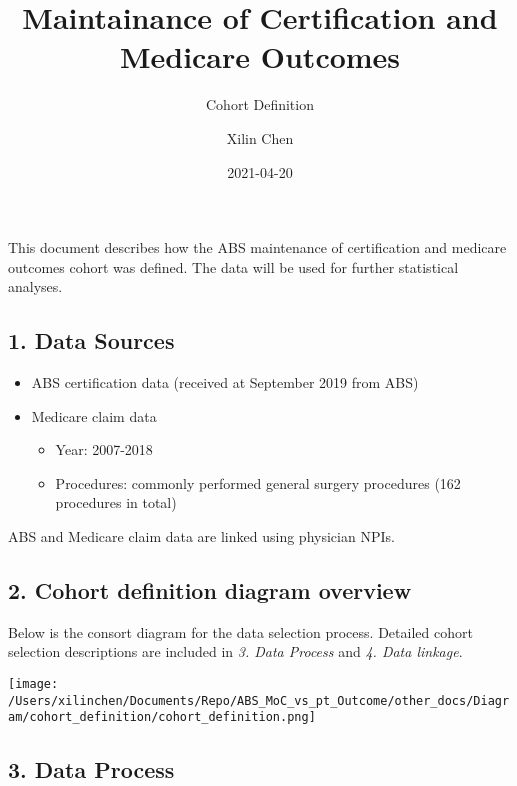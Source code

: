 \documentclass[
]{article}
\title{Maintainance of Certification and Medicare Outcomes}
\subtitle{Cohort Definition}
\author{Xilin Chen}
\date{2021-04-20}
\providecommand{\tightlist}{%
  \setlength{\itemsep}{0pt}\setlength{\parskip}{0pt}}
\begin{document}
\maketitle

{
\setcounter{tocdepth}{3}
\tableofcontents
}
This document describes how the ABS maintenance of certification and
medicare outcomes cohort was defined. The data will be used for further
statistical analyses.

\hypertarget{data-sources}{%
\subsection{1. Data Sources}\label{data-sources}}

\begin{itemize}
\tightlist
\item
  ABS certification data (received at September 2019 from ABS)
\item
  Medicare claim data

  \begin{itemize}
  \tightlist
  \item
    Year: 2007-2018
  \item
    Procedures: commonly performed general surgery procedures (162
    procedures in total)
  \end{itemize}
\end{itemize}

ABS and Medicare claim data are linked using physician NPIs.

\pagebreak

\hypertarget{cohort-definition-diagram-overview}{%
\subsection{2. Cohort definition diagram
overview}\label{cohort-definition-diagram-overview}}

Below is the consort diagram for the data selection process. Detailed
cohort selection descriptions are included in \emph{3. Data Process} and
\emph{4. Data linkage}.

\texttt{[image: /Users/xilinchen/Documents/Repo/ABS\_MoC\_vs\_pt\_Outcome/other\_docs/Diagram/cohort\_definition/cohort\_definition.png]}

\hypertarget{data-process}{%
\subsection{3. Data Process}\label{data-process}}
\end{document}

